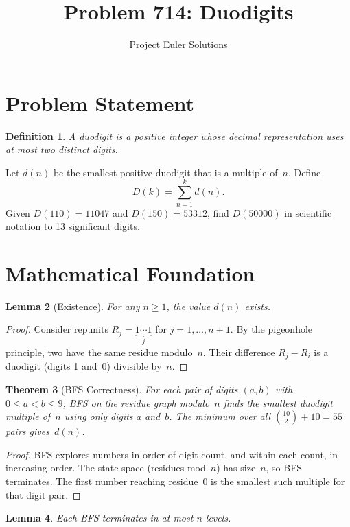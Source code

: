 \documentclass[11pt]{article}
\title{Problem 714: Duodigits}
\author{Project Euler Solutions}
\date{}
\newtheorem{theorem}{Theorem}
\newtheorem{lemma}[theorem]{Lemma}
\newtheorem{definition}[theorem]{Definition}
\begin{document}
\maketitle

\section{Problem Statement}

\begin{definition}
A \emph{duodigit} is a positive integer whose decimal representation uses at most two distinct digits.
\end{definition}

Let $d(n)$ be the smallest positive duodigit that is a multiple of~$n$. Define
\[
D(k) = \sum_{n=1}^{k} d(n).
\]
Given $D(110)=11047$ and $D(150)=53312$, find $D(50000)$ in scientific notation to 13 significant digits.

\section{Mathematical Foundation}

\begin{lemma}[Existence]
For any $n \ge 1$, the value $d(n)$ exists.
\end{lemma}

\begin{proof}
Consider repunits $R_j = \underbrace{1\cdots1}_{j}$ for $j=1,\ldots,n+1$. By the pigeonhole principle, two have the same residue modulo~$n$. Their difference $R_j - R_i$ is a duodigit (digits 1 and~0) divisible by~$n$.
\end{proof}

\begin{theorem}[BFS Correctness]
For each pair of digits $(a,b)$ with $0 \le a < b \le 9$, BFS on the residue graph modulo~$n$ finds the smallest duodigit multiple of~$n$ using only digits $a$ and~$b$. The minimum over all $\binom{10}{2}+10 = 55$ pairs gives~$d(n)$.
\end{theorem}

\begin{proof}
BFS explores numbers in order of digit count, and within each count, in increasing order. The state space (residues mod~$n$) has size~$n$, so BFS terminates. The first number reaching residue~0 is the smallest such multiple for that digit pair.
\end{proof}

\begin{lemma}
Each BFS terminates in at most $n$ levels.
\end{lemma}
\end{document}
